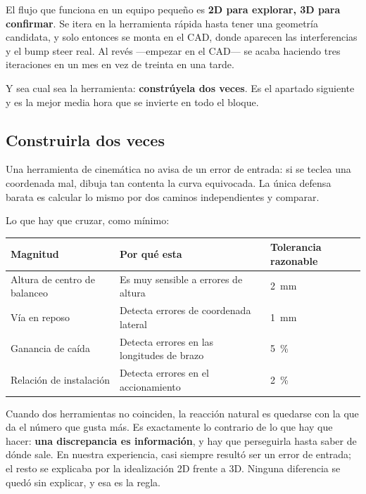 \begin{clave}
El flujo que funciona en un equipo pequeño es \textbf{2D para explorar, 3D para
confirmar}. Se itera en la herramienta rápida hasta tener una geometría
candidata, y solo entonces se monta en el CAD, donde aparecen las
interferencias y el bump steer real. Al revés ---empezar en el CAD--- se acaba
haciendo tres iteraciones en un mes en vez de treinta en una tarde.

Y sea cual sea la herramienta: \textbf{constrúyela dos veces}. Es el apartado
siguiente y es la mejor media hora que se invierte en todo el bloque.
\end{clave}

\subsection{Construirla dos veces}

Una herramienta de cinemática no avisa de un error de entrada: si se teclea una
coordenada mal, dibuja tan contenta la curva equivocada. La única defensa barata
es calcular lo mismo por dos caminos independientes y comparar.

Lo que hay que cruzar, como mínimo:

\begin{center}
\begin{tabularx}{\textwidth}{@{}lXl@{}}
\toprule
\textbf{Magnitud} & \textbf{Por qué esta} & \textbf{Tolerancia razonable} \\
\midrule
Altura de centro de balanceo & Es muy sensible a errores de altura & \SI{2}{\milli\meter} \\
Vía en reposo & Detecta errores de coordenada lateral & \SI{1}{\milli\meter} \\
Ganancia de caída & Detecta errores en las longitudes de brazo & \SI{5}{\percent} \\
Relación de instalación & Detecta errores en el accionamiento & \SI{2}{\percent} \\
\bottomrule
\end{tabularx}
\end{center}

\begin{ojo}
Cuando dos herramientas no coinciden, la reacción natural es quedarse con la
que da el número que gusta más. Es exactamente lo contrario de lo que hay que
hacer: \textbf{una discrepancia es información}, y hay que perseguirla hasta
saber de dónde sale. En nuestra experiencia, casi siempre resultó ser un error
de entrada; el resto se explicaba por la idealización 2D frente a 3D. Ninguna
diferencia se quedó sin explicar, y esa es la regla.
\end{ojo}


